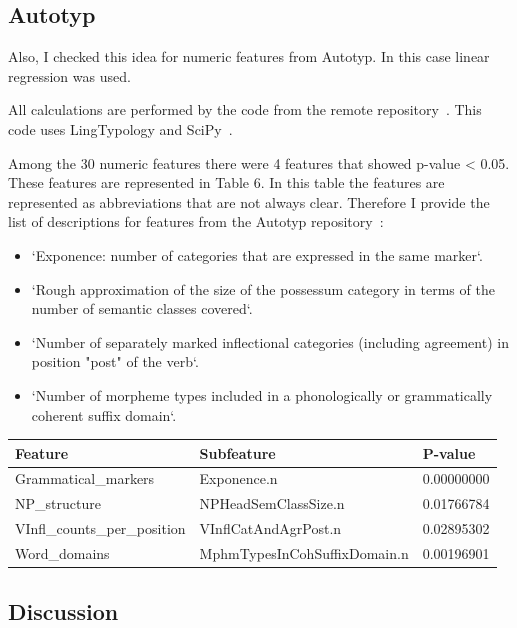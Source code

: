 \documentclass[a4paper,12pt]{article}
\begin{document}
\subsection{Autotyp}

Also, I checked this idea for numeric features from Autotyp. In this case linear regression was used.

All calculations are performed by the code from the remote repository~\parencite[PHOIBLE: Quantitative Research.ipynb]{lingtypologyResearch}. This code uses LingTypology and SciPy~\parencite{scipy}.

Among the 30 numeric features there were 4 features that showed p-value < 0.05.
These features are represented in Table 6. In this table the features are represented as abbreviations that are not always clear. Therefore I provide the list of descriptions for features from the Autotyp repository~\parencite[metadata\_overview.csv]{autotyp}:
\begin{itemize}
 \item `Exponence: number of categories that are expressed in the same marker`.
 \item `Rough approximation of the size of the possessum category in terms of the number of semantic classes covered`.
 \item `Number of separately marked inflectional categories (including agreement) in position "post" of the verb`.
 \item `Number of morpheme types included in a phonologically or grammatically coherent suffix domain`.
\end{itemize}

\noindent
\begin{minipage}{\textwidth}
\begin{tabular}{lll}
\toprule
Feature &                    Subfeature &     P-value \\
\midrule
Grammatical\_markers &                   Exponence.n &  0.00000000 \\
NP\_structure &          NPHeadSemClassSize.n &  0.01766784 \\
VInfl\_counts\_per\_position &          VInflCatAndAgrPost.n &  0.02895302 \\
Word\_domains &  MphmTypesInCohSuffixDomain.n &  0.00196901 \\
\bottomrule
\end{tabular}
\end{minipage}
\bigskip

\subsection{Discussion}
\end{document}

